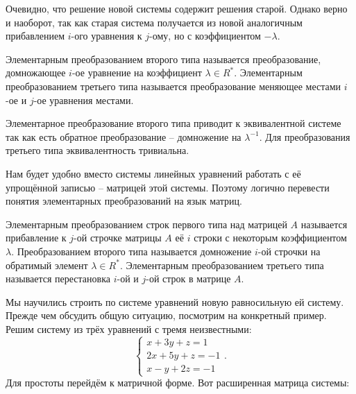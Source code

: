 \rm Очевидно, что решение новой системы содержит решения старой. Однако верно и наоборот, так как старая система получается из новой аналогичным прибавлением $i$-ого уравнения к $j$-ому, но с коэффициентом $-\lambda$.
\erm

\dfn  Элементарным преобразованием второго типа называется преобразование, домножающее $i$-ое уравнение на коэффициент $\lambda \in R^*$.
Элементарным преобразованием третьего типа называется преобразование меняющее местами $i$-ое и $j$-ое уравнения местами.
\edfn

\rm Элементарное преобразование второго типа приводит к эквивалентной системе так как есть обратное преобразование -- домножение на $\lambda^{-1}$. Для преобразования третьего типа эквивалентность тривиальна.
\erm





Нам будет удобно вместо системы линейных уравнений работать с её упрощённой записью -- матрицей этой системы. Поэтому логично перевести понятия элементарных преобразований на язык матриц.

\dfn Элементарным преобразованием строк первого типа над матрицей $A$ называется прибавление к $j$-ой строчке матрицы $A$ её $i$ строки с некоторым коэффициентом $\lambda$. Преобразованием второго типа называется домножение $i$-ой строчки на обратимый элемент $\lambda \in R^*$. Элементарным преобразованием третьего типа называется перестановка $i$-ой и $j$-ой строк в матрице $A$. 
\edfn

Мы научились строить по системе уравнений новую равносильную ей систему. Прежде чем обсудить общую ситуацию, посмотрим на конкретный пример. Решим систему из трёх уравнений с тремя неизвестными:
$$\begin{cases}
x+3y+z=1\\
2x+5y+z=-1\\
x-y+2z=-1
\end{cases}.
$$
Для простоты перейдём к матричной форме. Вот расширенная матрица системы:


